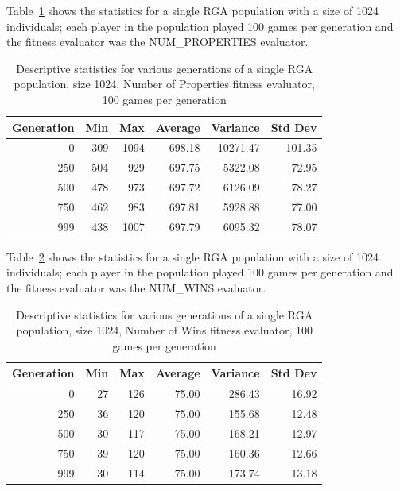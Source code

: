 Table~\ref{table-stats-for-s1024-n100-np} shows the statistics for a single
RGA population with a size of 1024 individuals; each player in the population
played 100 games per generation and the fitness evaluator was the NUM\_PROPERTIES
evaluator.

\begin{table}[ht]
\begin{center}
\begin{tabular}{ | r || r | r | r | r | r |}
\hline                        
Generation & Min & Max & Average & Variance & Std Dev \\ \hline \hline
0   & 309 & 1094 & 698.18 &  10271.47 & 101.35 \\ \hline
250 & 504 &  929 & 697.75 &   5322.08 &  72.95 \\ \hline
500 & 478 &  973 & 697.72 &   6126.09 &  78.27 \\ \hline
750 & 462 &  983 & 697.81 &   5928.88 &  77.00 \\ \hline
999 & 438 & 1007 & 697.79 &   6095.32 &  78.07 \\ \hline
\end{tabular}
\caption[RGA, Number of Properties, statistics]{Descriptive statistics for
various generations of a single RGA population, size 1024, Number of Properties
fitness evaluator, 100 games per generation}
\label{table-stats-for-s1024-n100-np}
\end{center}
\end{table}

Table~\ref{table-stats-for-s1024-n100-nw} shows the statistics for a single
RGA population with a size of 1024 individuals; each player in the population
played 100 games per generation and the fitness evaluator was the NUM\_WINS
evaluator.

\begin{table}[ht]
\begin{center}
\begin{tabular}{ | r || r | r | r | r | r |}
\hline                        
Generation & Min & Max & Average & Variance & Std Dev \\ \hline \hline
0   & 27 & 126 & 75.00 & 286.43 & 16.92 \\ \hline
250 & 36 & 120 & 75.00 & 155.68 & 12.48 \\ \hline
500 & 30 & 117 & 75.00 & 168.21 & 12.97 \\ \hline
750 & 39 & 120 & 75.00 & 160.36 & 12.66 \\ \hline
999 & 30 & 114 & 75.00 & 173.74 & 13.18 \\ \hline
\end{tabular}
\caption[RGA, Number of Wins, statistics]{Descriptive statistics for various
generations of a single RGA population, size 1024, Number of Wins fitness
evaluator, 100 games per generation}
\label{table-stats-for-s1024-n100-nw}
\end{center}
\end{table}

